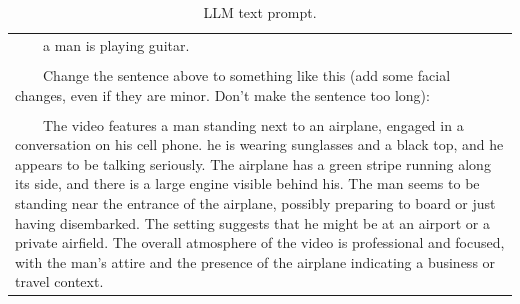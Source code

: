 \begin{table}
    \caption{LLM text prompt.}
    \label{LLM_text_prompt}
    \begin{tabularx}{\linewidth}{X}
        \hline
            \ \ \ \ a man is playing guitar.\\
            \\
            \ \ \ \ Change the sentence above to something like this (add some facial changes, even if they are minor. Don't make the sentence too long):\\
            \\
            \ \ \ \ The video features a man standing next to an airplane, engaged in a conversation on his cell phone. he is wearing sunglasses and a black top, and he appears to be talking seriously. The airplane has a green stripe running along its side, and there is a large engine visible behind his. The man seems to be standing near the entrance of the airplane, possibly preparing to board or just having disembarked. The setting suggests that he might be at an airport or a private airfield. The overall atmosphere of the video is professional and focused, with the man's attire and the presence of the airplane indicating a business or travel context.\\
        \hline
    \end{tabularx}
\end{table}